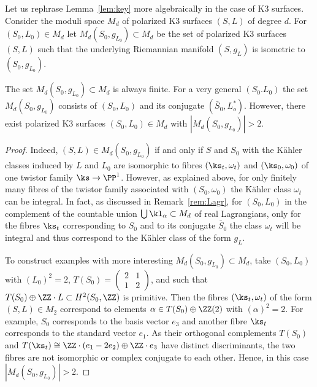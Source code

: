 Let us rephrase Lemma~\ref{lem:key} more algebraically in the case of K3 surfaces. Consider the moduli space $M_d$ of polarized K3 surfaces $(S,L)$ of degree $d$. For $(S_0,L_0)\in M_d$ let $M_d(S_0,g_{L_0})\subset M_d$ be the set of polarized K3 surfaces $(S,L)$ such that the underlying Riemannian manifold $(S,g_L)$ is isometric to $(S_0,g_{L_0})$.


\begin{coro}\label{cor:Omet}
The set $M_d(S_0,g_{L_0})\subset M_d$ is always finite. For a very general $(S_0.L_0)$ the set $M_d(S_0,g_{L_0})$ consists of $(S_0,L_0)$ and its conjugate $(\bar S_0,L_o^*)$. However, there exist polarized K3 surfaces $(S_0,L_0)\in M_d$ with $|M_d(S_0,g_{L_0})|>2$.
\end{coro}


\begin{proof}
Indeed, $(S,L)\in M_d(S_0,g_{L_0})$ if and only if $S$ and $S_0$ with the K\"ahler classes induced by $L$ and $L_0$ are isomorphic to fibres $(\ks_t,\omega_t)$ and $(\ks_0,\omega_0)$ of one twistor family $\ks\to\PP^1$. However, as explained above, for only finitely many fibres of the twistor family associated with $(S_0,\omega_0)$ the K\"ahler class $\omega_t$ can be integral. In fact, as discussed in Remark~\ref{rem:Lagr}, for $(S_0,L_0)$ in the complement of the countable union $\bigcup\kl_\alpha\subset M_d$ of real Lagrangians, only for the fibres $\ks_t$ corresponding to $S_0$ and to its conjugate $\bar S_0$ the class $\omega_t$ will be integral and thus correspond to the K\"ahler class of the form $g_L$.

To construct examples with more interesting $M_d(S_0,g_{L_0})\subset M_d$, take $(S_0,L_0)$ with $(L_0)^2=2$, $T(S_0)=\left(\begin{smallmatrix}2&1\\1&2\end{smallmatrix}\right)$, and such that $T(S_0)\oplus \ZZ\cdot L\subset H^2(S_0,\ZZ)$ is primitive. Then the fibres $(\ks_t,\omega_t)$ of the form $(S,L)\in M_2$ correspond to elements $\alpha\in T(S_0)\oplus\ZZ(2)$ with $(\alpha)^2=2$. For example, $S_0$ corresponds to the basis vector $e_3$ and another fibre $\ks_t$ corresponds to the standard vector $e_1$. As their orthogonal complements $T(S_0)$ and $T(\ks_t)\cong\ZZ\cdot (e_1-2e_2)\oplus\ZZ\cdot e_3$ have distinct discriminants, the two fibres are not isomorphic or complex conjugate to each other. Hence, in this case $|M_d(S_0,g_{L_0})|>2$.
\end{proof}


